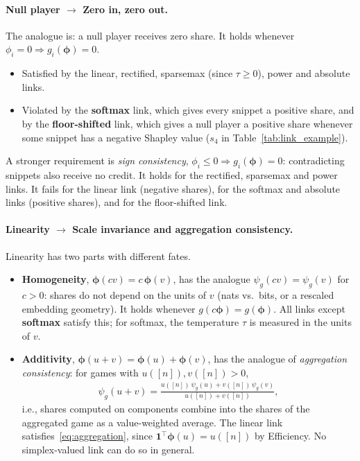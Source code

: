 \paragraph{Null player $\to$ Zero in, zero out.}
The analogue is: a null player receives zero share. It holds whenever $\phi_i = 0 \Rightarrow g_i(\boldsymbol{\phi}) = 0$.
\begin{itemize}
    \item Satisfied by the linear, rectified, sparsemax (since $\tau \ge 0$), power and absolute links.
    \item Violated by the \textbf{softmax} link, which gives every snippet a positive share, and by the \textbf{floor-shifted} link, which gives a null player a positive share whenever some snippet has a negative Shapley value ($s_4$ in Table~\ref{tab:link_example}).
\end{itemize}
A stronger requirement is \emph{sign consistency}, $\phi_i \le 0 \Rightarrow g_i(\boldsymbol{\phi}) = 0$: contradicting snippets also receive no credit. It holds for the rectified, sparsemax and power links. It fails for the linear link (negative shares), for the softmax and absolute links (positive shares), and for the floor-shifted link.

\paragraph{Linearity $\to$ Scale invariance and aggregation consistency.}
Linearity has two parts with different fates.
\begin{itemize}
    \item \textbf{Homogeneity}, $\boldsymbol{\phi}(cv) = c\, \boldsymbol{\phi}(v)$, has the analogue $\psi_g(cv) = \psi_g(v)$ for $c > 0$: shares do not depend on the units of $v$ (nats vs.\ bits, or a rescaled embedding geometry). It holds whenever $g(c\boldsymbol{\phi}) = g(\boldsymbol{\phi})$. All links except \textbf{softmax} satisfy this; for softmax, the temperature $\tau$ is measured in the units of $v$.
    \item \textbf{Additivity}, $\boldsymbol{\phi}(u + v) = \boldsymbol{\phi}(u) + \boldsymbol{\phi}(v)$, has the analogue of \emph{aggregation consistency}: for games with $u([n]), v([n]) > 0$,
    \begin{align}\label{eq:aggregation}
        \psi_g(u + v) = \frac{u([n])\, \psi_g(u) + v([n])\, \psi_g(v)}{u([n]) + v([n])},
    \end{align}
    i.e., shares computed on components combine into the shares of the aggregated game as a value-weighted average. The linear link satisfies~\eqref{eq:aggregation}, since $\mathbf{1}^\top \boldsymbol{\phi}(u) = u([n])$ by Efficiency. No simplex-valued link can do so in general.
\end{itemize}

